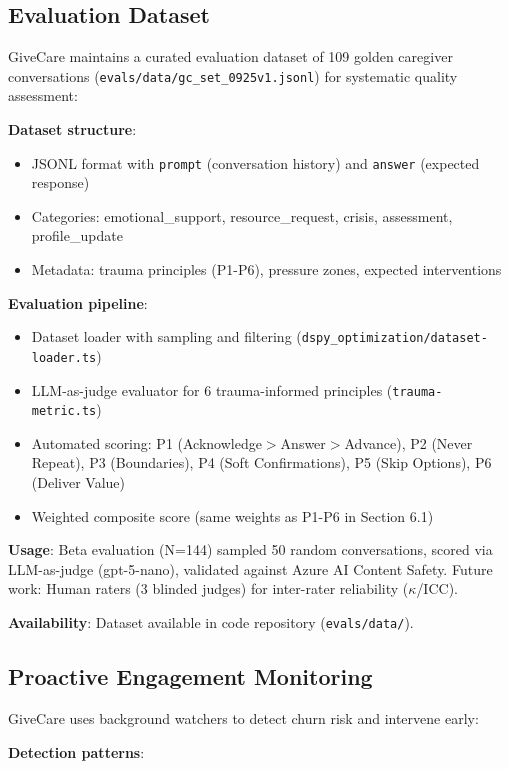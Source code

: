 \documentclass{article}%
\begin{document}
%
\subsection{Evaluation Dataset}%
\label{subsec:EvaluationDataset}%
GiveCare maintains a curated evaluation dataset of 109 golden caregiver conversations (\texttt{evals/data/gc\_set\_0925v1.jsonl}) for systematic quality assessment:

\textbf{Dataset structure}:
\begin{itemize}
    \item JSONL format with \texttt{prompt} (conversation history) and \texttt{answer} (expected response)
    \item Categories: emotional\_support, resource\_request, crisis, assessment, profile\_update
    \item Metadata: trauma principles (P1-P6), pressure zones, expected interventions
\end{itemize}

\textbf{Evaluation pipeline}:
\begin{itemize}
    \item Dataset loader with sampling and filtering (\texttt{dspy\_optimization/dataset-loader.ts})
    \item LLM-as-judge evaluator for 6 trauma-informed principles (\texttt{trauma-metric.ts})
    \item Automated scoring: P1 (Acknowledge$>$Answer$>$Advance), P2 (Never Repeat), P3 (Boundaries), P4 (Soft Confirmations), P5 (Skip Options), P6 (Deliver Value)
    \item Weighted composite score (same weights as P1-P6 in Section 6.1)
\end{itemize}

\textbf{Usage}: Beta evaluation (N=144) sampled 50 random conversations, scored via LLM-as-judge (gpt-5-nano), validated against Azure AI Content Safety. Future work: Human raters (3 blinded judges) for inter-rater reliability ($\kappa$/ICC).

\textbf{Availability}: Dataset available in code repository (\texttt{evals/data/}).

%
\subsection{Proactive Engagement Monitoring}%
\label{subsec:ProactiveEngagementMonitoring}%
GiveCare uses background watchers to detect churn risk and intervene early:

\textbf{Detection patterns}:
\end{document}
